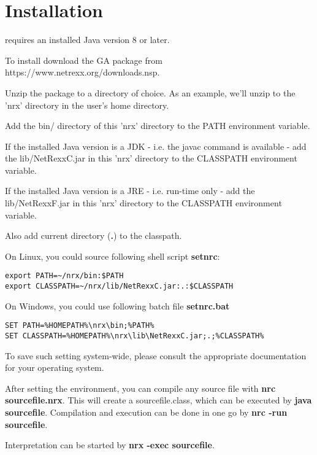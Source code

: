 \section{Installation}
\nr{} requires an installed Java version 8 or later.

To install \nr{} download the GA package from https://www.netrexx.org/downloads.nsp.

Unzip the package to a directory of choice. As an example, we'll unzip to the 'nrx' directory in the user's home directory.

Add the bin/ directory of this 'nrx' directory to the PATH environment variable.

If the installed Java version is a JDK - i.e. the javac command is available - add the lib/NetRexxC.jar in this 'nrx' directory to the CLASSPATH environment variable.

If the installed Java version is a JRE - i.e. run-time only - add the lib/NetRexxF.jar in this 'nrx' directory to the CLASSPATH environment variable. 

Also add current directory (\textbf{.}) to the classpath.

On Linux, you could source following shell script \textbf{setnrc}:

\begin{lstlisting}
export PATH=~/nrx/bin:$PATH
export CLASSPATH=~/nrx/lib/NetRexxC.jar:.:$CLASSPATH
\end{lstlisting}

On Windows, you could use following batch file \textbf{setnrc.bat}

\begin{lstlisting}
SET PATH=%HOMEPATH%\nrx\bin;%PATH%
SET CLASSPATH=%HOMEPATH%\nrx\lib\NetRexxC.jar;.;%CLASSPATH%
\end{lstlisting}

To save such setting system-wide, please consult the appropriate documentation for your operating system.

After setting the environment, you can compile any \nr{} source file with \textbf{nrc sourcefile.nrx}. This will create a sourcefile.class, which can be executed by \textbf{java sourcefile}.
Compilation and execution can be done in one go by \textbf{nrc -run sourcefile}.

Interpretation can be started by \textbf{nrx -exec sourcefile}.

